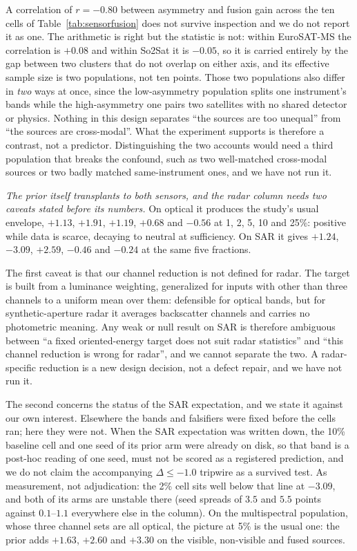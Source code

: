  A correlation of $r = -0.80$ between asymmetry and fusion gain across the ten
cells of Table~\ref{tab:sensorfusion} does not survive inspection and we do not
report it as one. The arithmetic is right but the statistic is not: within
EuroSAT-MS the correlation is $+0.08$ and within So2Sat it is $-0.05$, so it is
carried entirely by the gap between two clusters that do not overlap on either
axis, and its effective sample size is two populations, not ten points. Those
two populations also differ in \emph{two} ways at once, since the
low-asymmetry population splits one instrument's bands while the high-asymmetry
one pairs two satellites with no shared detector or physics. Nothing in this
design separates ``the sources are too unequal'' from ``the sources are
cross-modal''. What the experiment supports is therefore a contrast, not a
predictor. Distinguishing the two accounts would need a third population that
breaks the confound, such as two well-matched cross-modal sources or two badly
matched same-instrument ones, and we have not run it.

\emph{The prior itself transplants to both sensors, and the radar column needs
two caveats stated before its numbers.}  On optical it produces
the study's usual envelope, $+1.13$, $+1.91$, $+1.19$, $+0.68$ and $-0.56$ at
1, 2, 5, 10 and 25\%: positive while data is scarce, decaying to neutral at
sufficiency. On SAR it gives $+1.24$, $-3.09$, $+2.59$, $-0.46$ and $-0.24$ at
the same five fractions.

The first caveat is that our channel reduction is not defined for radar. The
target is built from a luminance weighting, generalized for inputs with other
than three channels to a uniform mean over them: defensible for optical bands,
but for synthetic-aperture radar it averages backscatter channels and carries
no photometric meaning. Any weak or null result on SAR is therefore ambiguous
between ``a fixed oriented-energy target does not suit radar statistics'' and
``this channel reduction is wrong for radar'', and we cannot separate the two.
A radar-specific reduction is a new design decision, not a defect
repair, and we have not run it.

 The second concerns the status of the SAR expectation, and we state it against
our own interest. Elsewhere the bands and falsifiers were fixed before the
cells ran; here they were not. When the SAR expectation was written down, the
10\% baseline cell and one seed of its prior arm were already on disk, so that
band is a post-hoc reading of one seed, must not be scored as a registered
prediction, and we do not claim the accompanying $\Delta \le -1.0$ tripwire as
a survived test. As measurement, not adjudication: the 2\% cell sits
well below that line at $-3.09$, and both of its arms are unstable there (seed
spreads of $3.5$ and $5.5$ points against $0.1$--$1.1$ everywhere else in the
column). On the multispectral population, whose three channel sets are all
optical, the picture at 5\% is the usual one: the prior adds $+1.63$, $+2.60$
and $+3.30$ on the visible, non-visible and fused sources.

